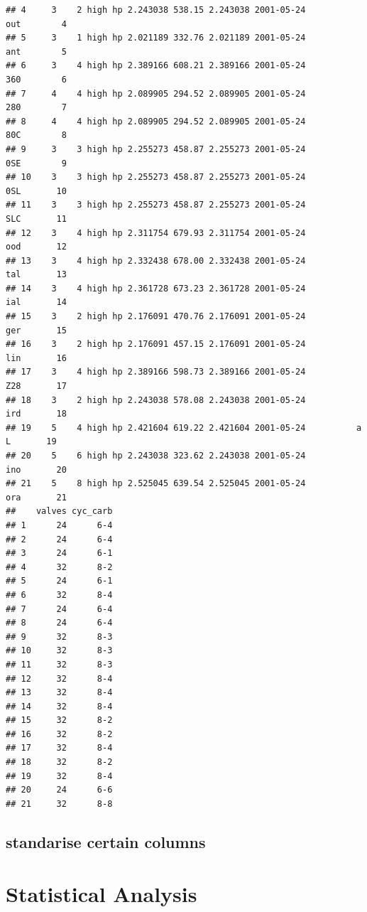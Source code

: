 \documentclass[
]{article}
\begin{document}
\begin{verbatim}
## 4     3    2 high hp 2.243038 538.15 2.243038 2001-05-24          out        4
## 5     3    1 high hp 2.021189 332.76 2.021189 2001-05-24          ant        5
## 6     3    4 high hp 2.389166 608.21 2.389166 2001-05-24          360        6
## 7     4    4 high hp 2.089905 294.52 2.089905 2001-05-24          280        7
## 8     4    4 high hp 2.089905 294.52 2.089905 2001-05-24          80C        8
## 9     3    3 high hp 2.255273 458.87 2.255273 2001-05-24          0SE        9
## 10    3    3 high hp 2.255273 458.87 2.255273 2001-05-24          0SL       10
## 11    3    3 high hp 2.255273 458.87 2.255273 2001-05-24          SLC       11
## 12    3    4 high hp 2.311754 679.93 2.311754 2001-05-24          ood       12
## 13    3    4 high hp 2.332438 678.00 2.332438 2001-05-24          tal       13
## 14    3    4 high hp 2.361728 673.23 2.361728 2001-05-24          ial       14
## 15    3    2 high hp 2.176091 470.76 2.176091 2001-05-24          ger       15
## 16    3    2 high hp 2.176091 457.15 2.176091 2001-05-24          lin       16
## 17    3    4 high hp 2.389166 598.73 2.389166 2001-05-24          Z28       17
## 18    3    2 high hp 2.243038 578.08 2.243038 2001-05-24          ird       18
## 19    5    4 high hp 2.421604 619.22 2.421604 2001-05-24          a L       19
## 20    5    6 high hp 2.243038 323.62 2.243038 2001-05-24          ino       20
## 21    5    8 high hp 2.525045 639.54 2.525045 2001-05-24          ora       21
##    valves cyc_carb
## 1      24      6-4
## 2      24      6-4
## 3      24      6-1
## 4      32      8-2
## 5      24      6-1
## 6      32      8-4
## 7      24      6-4
## 8      24      6-4
## 9      32      8-3
## 10     32      8-3
## 11     32      8-3
## 12     32      8-4
## 13     32      8-4
## 14     32      8-4
## 15     32      8-2
## 16     32      8-2
## 17     32      8-4
## 18     32      8-2
## 19     32      8-4
## 20     24      6-6
## 21     32      8-8
\end{verbatim}

\hypertarget{standarise-certain-columns}{%
\subsection{standarise certain columns}\label{standarise-certain-columns}}

\hypertarget{statistical-analysis}{%
\section{Statistical Analysis}\label{statistical-analysis}}
\end{document}
